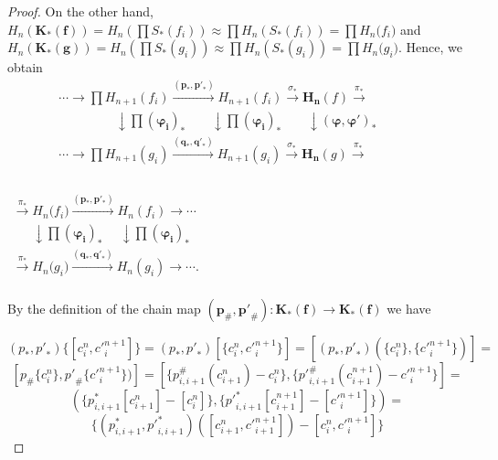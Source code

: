 \documentclass[10pt]{article}
\theoremstyle{definition}
\begin{document}
\begin{proof}
On the other hand, $H_{n}(\mathbf K_{*}( \mathbf{f}))=
H_{n}(\prod{S_{*}(f_{i})})\approx \prod{H_{n}(S_{*}(f_{i})) } =\prod{H_{n}(f_{i}})$ and $H_{n}(\mathbf K_{*}( \mathbf{g}))=
H_{n}(\prod{S_{*}(g_{i})})\approx \prod{H_{n}(S_{*}(g_{i})) } =\prod{H_{n}(g_{i}})$.
Hence, we obtain 
$$
\begin{matrix}
   \cdots \to \prod H_{n+1}(f_i){{\stackrel{(\mathbf p_{*},{\mathbf p'}_{*})}{\longrightarrow}}} H_{n+1}(f_i){{\stackrel{\sigma
_{*}}{\longrightarrow}}} \mathbf{H_{n}}(f){{\stackrel{\pi _{*}}{\longrightarrow}}}  \\
   ~~~~~~~~~~~~~~~~~~~~\downarrow \prod (\mathbf{\varphi_{i}})_{*}~~~~~~~~~\downarrow \prod (\mathbf{\varphi_{i}})_{*}~~~~~~~~~\downarrow \left( {{\mathbf{\varphi }}},\mathbf{{\varphi}' } \right)_{*}~~~~~~~~~~~~~~ \\
   \cdots \to \prod H_{n+1}(g_i){{\stackrel{(\mathbf q_{*},{\mathbf q'}_{*})}{\longrightarrow}}} H_{n+1}(g_i){{\stackrel{\sigma
_{*}}{\longrightarrow}}} \mathbf{H_{n}}(g){{\stackrel{\pi _{*}}{\longrightarrow}}}\\
\end{matrix}
$$
~~~~~~~~~~~~~~~~~~~~~~~~~~~~~~~~~~~~~~~~~~~~~~~~~~~~~~~$
\begin{matrix}
   {{\stackrel{\pi _{*}}{\longrightarrow}}}{H_{n}(f_i}){{\stackrel{(\mathbf p_{*},\mathbf {p'}_{*})}{\longrightarrow}}}H_{n}(f_i)\to \cdots  \\
   ~~~~~~~\downarrow \prod (\mathbf{\varphi_{i}})_{*} ~~~~~~\downarrow \prod (\mathbf{\varphi_{i}})_{*} \\
  {{\stackrel{\pi _{*}}{\longrightarrow}}}{H_{n}(g_i}){{\stackrel{(\mathbf q_{*},\mathbf {q'}_{*})}{\longrightarrow}}}H_{n}(g_i)\to \cdots . \\
\end{matrix}
$

By the definition of the chain map $ (\mathbf{p_{\#}},\mathbf{{p'}_{\#}}): \mathbf {K_{*}( \mathbf {f})} \to  \mathbf {K_{*}( \mathbf {f})}$ we have 

$$\left( p_{*},{p'}_{*} \right) \lbrace \left[ c_i^n,{c'}_i^{n+1} \right] \rbrace=\left( p_{*},{p'}_{*} \right) \left[ \lbrace c_i^n,{c'}_i^{n+1} \rbrace \right]= \left[ \left( p_{*},{p'}_{*} \right) \left( \lbrace c_i^n \rbrace, \lbrace {c'}_i^{n+1} \rbrace \right) \right]=$$
$$\left[ p_{\#} \lbrace c_i^n \rbrace ,{p'}_{\#} \lbrace {c'}_i^{n+1} \rbrace) \right] =\left[ \lbrace p_{i,i+1}^{\#}(c_{i+1}^n)-{c}_i^n \rbrace, \lbrace {p'}_{i,i+1}^{\#} \left( c_{i+1}^{n+1} \right) - {c'}_i^{n+1} \rbrace \right]=$$
$$\left( \lbrace p_{i,i+1}^{*} \left[ c_{i+1}^n \right]- \left[ {c}_i^n \right]  \rbrace, \lbrace {p'}_{i,i+1}^{*}\left[ c_{i+1}^{n+1} \right] - \left[ {c'}_i^{n+1} \right]  \rbrace \right)=$$
$$ \lbrace \left( p_{i,i+1}^{*}, {p'}_{i,i+1}^{*} \right) \left( \left[ c_{i+1}^n, {c'}_{i+1}^{n+1} \right] \right) - \left[ c_{i}^n, {c'}_{i}^{n+1} \right] \rbrace$$


\end{proof}
\end{document}
